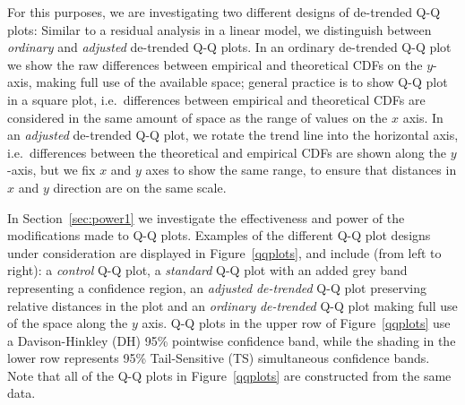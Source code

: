 \documentclass[12pt]{article}\usepackage[]{graphicx}\usepackage[]{color}
\newcommand{\hh}[1]{{\color{magenta} #1}}
\newcommand{\HH}[1]{{\color{orange} #1}}
\begin{document}
\hh{For this purposes, we are investigating two different designs of de-trended Q-Q plots: }
\HH{Similar to a residual analysis in a linear model, we distinguish between {\it ordinary} and {\it adjusted} de-trended Q-Q plots. In an ordinary de-trended Q-Q plot we show the raw differences between empirical and theoretical CDFs on the $y$-axis, making full use of the available space; general practice is to show Q-Q plot in a square plot, i.e.\ differences between empirical and theoretical CDFs are considered in  the same amount of space as the range of values on the $x$ axis. }
\HH{In an {\it adjusted} de-trended Q-Q plot, we rotate the trend line into the horizontal axis, i.e.\ differences between the theoretical and empirical CDFs are shown along the $y$-axis, but we fix $x$ and $y$ axes to show the same range, to ensure that distances in $x$ and $y$ direction are on the same scale. 
}



In Section~\ref{sec:power1} we investigate the effectiveness and power of the modifications made to Q-Q plots.
Examples of the different Q-Q plot designs under consideration are displayed in Figure~\ref{qqplots}, and include (from left to right): a \emph{control} Q-Q plot, a \emph{standard} Q-Q plot with an added grey band representing a confidence region, an \emph{adjusted} \emph{de-trended} Q-Q plot preserving relative distances in the plot and an \emph{ordinary} \emph{de-trended} Q-Q plot making full use of the space along the $y$ axis.
Q-Q plots in the upper row of Figure~\ref{qqplots} use a Davison-Hinkley (DH) 95\% pointwise confidence band, while the shading in the lower row represents 95\% Tail-Sensitive (TS) simultaneous confidence bands.
Note that all of the Q-Q plots in Figure~\ref{qqplots} are constructed from the same data. 
\end{document}
